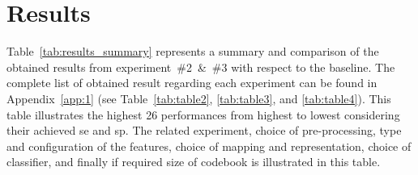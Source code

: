 %
%

\section{Results}\label{sec:res}
Table~\ref{tab:results_summary} represents a summary and comparison of the obtained results from experiment~\#2~\&~\#3 with respect to the baseline.
The complete list of obtained result regarding each experiment can be found in Appendix~\ref{app:1} (see Table~\ref{tab:table2}, \ref{tab:table3}, and \ref{tab:table4}).
This table illustrates the highest 26 performances from highest to lowest considering their achieved \ac{se} and \ac{sp}.
The related experiment, choice of pre-processing, type and configuration of the features, choice of mapping and representation, choice of classifier, and finally if required size of codebook is illustrated in this table.




